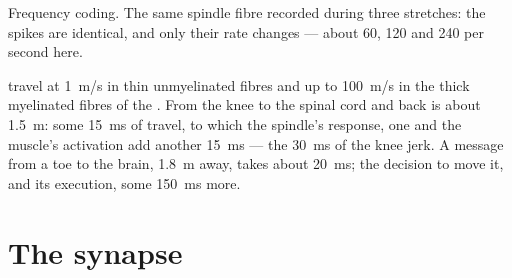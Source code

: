 \begin{omfigure}

{\small Frequency coding. The same spindle fibre recorded during three
stretches: the spikes are identical, and only their rate changes ---
about 60, 120 and 240 per second here.}
\end{omfigure}

\begin{example}[Speed]\label{ex:g12:stretch-reflex:speed}
 travel at \qty{1}{m/s} in thin unmyelinated fibres
and up to \qty{100}{m/s} in the thick myelinated fibres of the . From the knee to the spinal cord and back is about
\qty{1.5}{m}: some \qty{15}{ms} of travel, to which the spindle's
response, one  and the muscle's activation add another
\qty{15}{ms} --- the \qty{30}{ms} of the knee jerk. A message from a
toe to the brain, \qty{1.8}{m} away, takes about \qty{20}{ms}; the
decision to move it, and its execution, some \qty{150}{ms} more.
\end{example}

\section{The synapse}

